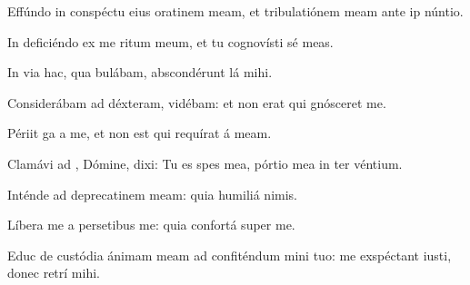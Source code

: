 \item {}

\item Effúndo in conspéctu eius oratinem meam,\psstar{} et tribulatiónem meam ante ip núntio.

\item In deficiéndo ex me ritum meum,\psstar{} et tu cognovísti sé meas.

\item In via hac, qua bulábam,\psstar{} abscondérunt lá mihi.

\item Considerábam ad déxteram,  vidébam:\psstar{} et non erat qui gnósceret me.

\item Périit ga a me,\psstar{} et non est qui requírat á meam.

\item Clamávi ad , Dómine,\psstar{} dixi: Tu es spes mea, pórtio mea in ter véntium.

\item Inténde ad deprecatinem meam:\psstar{} quia humiliá  nimis.

\item Líbera me a persetibus me:\psstar{} quia confortá  super me.

\item Educ de custódia ánimam meam ad confiténdum mini tuo:\psstar{} me exspéctant iusti, donec retrí mihi.
